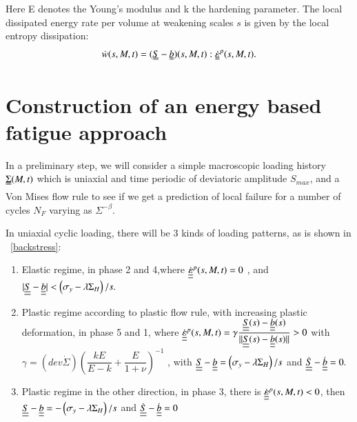\documentclass[3p,times,number,review]{elsarticle}
\newcommand{\figref}[1]{\figurename~\ref{#1}}
\begin{document}
Here E denotes the Young's modulus and k the hardening parameter. The local dissipated energy rate per volume at weakening scales $s$  is given by the local entropy dissipation:
\begin{equation}
	\dot{w}(s,M,t)=(\uuline{S}-\uuline{b})(s,M,t):\uuline{\dot{\varepsilon}}^p(s,M,t).
	\label{dissipated}
\end{equation}

\section{Construction of an energy based fatigue approach}

In a preliminary step, we will consider a simple macroscopic loading history $\uuline{\Sigma}(M, t)$ which is uniaxial
and time periodic of deviatoric amplitude $S_{max}$, and a Von Mises flow rule to see if we get a prediction of local failure for a number of cycles $N_F$ varying as $\Sigma^{-\beta}.$


\noindent
In uniaxial cyclic loading, there will be 3 kinds of loading patterns, as is shown in \figref{backstress}:

\vspace{6pt}
\begin{enumerate}
	
	\item	Elastic regime, in phase 2 and 4,where $\dot{\uline{\uline{\varepsilon}}}^p(s,M,t)=0$ ,  and $|\uline{\uline{S}}-\uline{\uline{b}}|<\left( \sigma_y-\lambda \Sigma_H\right)/s. $ 
	\vspace{6pt}
	
	\item Plastic regime according to plastic flow rule, with increasing plastic deformation, in phase 5 and 1, where	$\dot{\uline{\uline{\varepsilon}}}^p(s,M,t)=\gamma\dfrac{\uline{\uline{S}}(s)-\uline{\uline{b}}(s)}{||\uline{\uline{S}}(s)-\uline{\uline{b}}(s)||}> 0$ with  $\gamma=\left( dev\dot{\Sigma}\right)\left(\dfrac{kE}{E-k}+\dfrac{E}{1+\nu} \right) ^{-1}$ ,  with $\uline{\uline{S}}-\uline{\uline{b}}=\left( \sigma_y-\lambda \Sigma_H\right)/s$ and $\dot{\uline{\uline{S}}}-\dot{\uline{\uline{b}}}=0.$ 
	\vspace{6pt}
	
	\item Plastic regime in the other direction, in phase 3, there is	$\dot{\uline{\uline{\varepsilon}}}^p(s,M,t)<0$,  then $\uline{\uline{S}}-\uline{\uline{b}}=-\left( \sigma_y-\lambda \Sigma_H\right)/s$ and $\dot{\uline{\uline{S}}}-\dot{\uline{\uline{b}}}=0$ 
	
\end{enumerate}	
\end{document}
